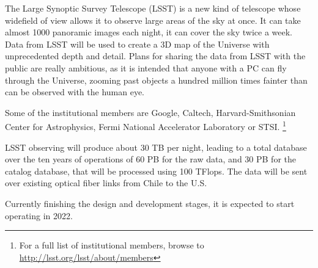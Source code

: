 The Large Synoptic Survey Telescope (LSST) is a new kind of telescope whose widefield of view allows it to observe large areas of the sky at once. It can take almost 1000 panoramic images each night, it can cover the sky twice a week. Data from LSST will be used to create a 3D map of the Universe with unprecedented depth and detail. Plans for sharing the data from LSST with the public are really ambitious, as it is intended that anyone with a PC can fly through the Universe, zooming past objects a hundred million times fainter than can be observed with the human eye. 

Some of the institutional members are Google, Caltech, Harvard-Smithsonian Center for Astrophysics, Fermi National Accelerator Laboratory or STSI. \footnote{For a full list of institutional members, browse to \url{http://lsst.org/lsst/about/members}}  


LSST observing will produce about 30 TB per night, leading to a total database over the ten years of operations of 60 PB for the raw data, and 30 PB for the catalog database, that will be processed using 100 TFlops. The data will be sent over existing optical fiber links from Chile to the U.S. 

Currently finishing the design and development stages, it is expected to start operating in 2022.

